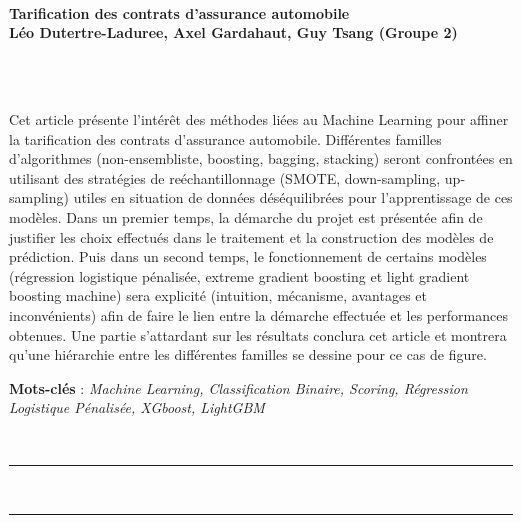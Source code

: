 \documentclass[french]{article}
\makeatletter
\def\vhrulefill#1{\leavevmode\leaders\hrule\@height#1\hfill \kern\z@}
\renewenvironment{abstract} %
 {\par\noindent\textbf{\abstractname}\ \ignorespaces\\}
 {\par\medskip}
\makeatother
\begin{document}
\noindent\begin{minipage}{\textwidth}

\ \\[30pt]

{\LARGE \bf Tarification des contrats d'assurance automobile} \\

{\large \bf Léo Dutertre-Laduree, 
            Axel Gardahaut, 
            Guy Tsang (Groupe 2)}



\end{minipage}

\



\null

\begin{mybox}
\begin{abstract}
Cet article présente l'intérêt des méthodes liées au Machine Learning pour affiner la tarification des contrats d'assurance automobile. Différentes familles d'algorithmes (non-ensembliste, boosting, bagging, stacking) seront confrontées en utilisant des stratégies de reéchantillonnage (SMOTE, down-sampling, up-sampling) utiles en situation de données déséquilibrées pour l'apprentissage de ces modèles. Dans un premier temps, la démarche du projet est présentée afin de justifier les choix effectués dans le traitement et la construction des modèles de prédiction. Puis dans un second temps, le fonctionnement de certains modèles (régression logistique pénalisée, extreme gradient boosting et light gradient boosting machine) sera explicité (intuition, mécanisme, avantages et inconvénients) afin de faire le lien entre la démarche effectuée et les performances obtenues. Une partie s'attardant sur les résultats conclura cet article et montrera qu'une hiérarchie entre les différentes familles se dessine pour ce cas de figure.

\noindent \textbf{Mots-clés} : \emph{Machine Learning, Classification Binaire, Scoring, Régression Logistique Pénalisée, XGboost, LightGBM}
\end{abstract}
\end{mybox}


\

\noindent \vhrulefill{1.5pt} ~ ~ \vhrulefill{1.5pt}
\end{document}
